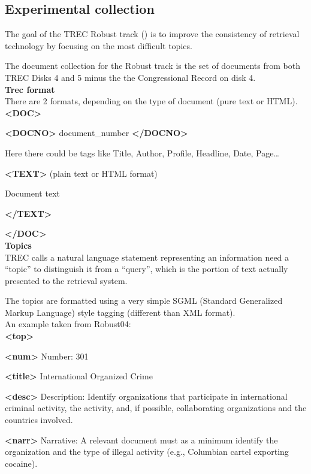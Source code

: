 \subsection{Experimental collection}

The goal of the TREC Robust track (\cite{rob04}) is to improve the consistency of retrieval
technology by focusing on the most difficult topics.

The document collection for the Robust track is the set of documents from both TREC Disks 4 and 5 minus the the Congressional Record on disk 4.\\

\textbf{Trec format}\\

There are 2 formats, depending on the type of document (pure text or HTML).\\

\textbf{<DOC>}

\textbf{<DOCNO>} document\_number \textbf{</DOCNO>}

Here there could be tags like Title, Author, Profile, Headline, Date,
Page\dots
 
\textbf{<TEXT>} (plain text or HTML format)

Document text
 
\textbf{</TEXT>}

\textbf{</DOC>}\\

\textbf{Topics}\\

TREC calls a natural language statement representing an information need a ``topic'' to distinguish it from a ``query'', which is the portion of text actually presented to the retrieval system.

The topics are formatted using a very simple SGML (Standard Generalized Markup Language) style tagging (different than XML format).\\

An example taken from Robust04:\\

\textbf{<top>}

\textbf{<num>} Number: 301

\textbf{<title>} International Organized Crime

\textbf{<desc>} Description: 
Identify organizations that participate in international criminal activity,
the activity, and, if possible, collaborating organizations and the countries
involved.

\textbf{<narr>} Narrative:
A relevant document must as a minimum identify the organization and the type of
illegal activity (e.g., Columbian cartel exporting cocaine).

